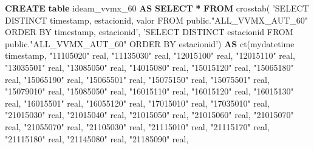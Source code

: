 \documentclass[12pt,oneside]{reedthesis}
\newenvironment{Shaded}{\begin{snugshade}}{\end{snugshade}}
\newcommand{\DataTypeTok}[1]{\textcolor[rgb]{0.13,0.29,0.53}{#1}}
\newcommand{\KeywordTok}[1]{\textcolor[rgb]{0.13,0.29,0.53}{\textbf{#1}}}
\newcommand{\NormalTok}[1]{#1}
\newcommand{\OperatorTok}[1]{\textcolor[rgb]{0.81,0.36,0.00}{\textbf{#1}}}
\newcommand{\OtherTok}[1]{\textcolor[rgb]{0.56,0.35,0.01}{#1}}
\newcommand{\StringTok}[1]{\textcolor[rgb]{0.31,0.60,0.02}{#1}}
\begin{document}
\vspace{0.4cm}
\begin{Shaded}
\begin{Highlighting}[]
    \KeywordTok{CREATE} \KeywordTok{table}\NormalTok{ ideam_vvmx_60 }\KeywordTok{AS}
    \KeywordTok{SELECT} \OperatorTok{*} \KeywordTok{FROM}\NormalTok{ crosstab(}
    \StringTok{'SELECT DISTINCT}
\StringTok{      timestamp,}
\StringTok{      estacionid,}
\StringTok{      valor}
\StringTok{    FROM }
\StringTok{      public."ALL_VVMX_AUT_60" }
\StringTok{    ORDER BY timestamp, estacionid'}\NormalTok{,}
    \StringTok{'SELECT DISTINCT}
\StringTok{      estacionid}
\StringTok{    FROM }
\StringTok{      public."ALL_VVMX_AUT_60" }
\StringTok{    ORDER BY estacionid'}\NormalTok{)}
    \KeywordTok{AS}\NormalTok{ ct(mydatetime }\DataTypeTok{timestamp}\NormalTok{, }\OtherTok{"11105020"} \DataTypeTok{real}\NormalTok{, }\OtherTok{"11135030"} \DataTypeTok{real}\NormalTok{, }\OtherTok{"12015100"} \DataTypeTok{real}\NormalTok{, }\OtherTok{"12015110"} \DataTypeTok{real}\NormalTok{,}
     \OtherTok{"13035501"} \DataTypeTok{real}\NormalTok{, }\OtherTok{"13085050"} \DataTypeTok{real}\NormalTok{, }\OtherTok{"14015080"} \DataTypeTok{real}\NormalTok{, }\OtherTok{"15015120"} \DataTypeTok{real}\NormalTok{, }\OtherTok{"15065180"} \DataTypeTok{real}\NormalTok{, }\OtherTok{"15065190"} \DataTypeTok{real}\NormalTok{, }
     \OtherTok{"15065501"} \DataTypeTok{real}\NormalTok{, }\OtherTok{"15075150"} \DataTypeTok{real}\NormalTok{, }\OtherTok{"15075501"} \DataTypeTok{real}\NormalTok{, }\OtherTok{"15079010"} \DataTypeTok{real}\NormalTok{, }\OtherTok{"15085050"} \DataTypeTok{real}\NormalTok{, }\OtherTok{"16015110"} \DataTypeTok{real}\NormalTok{, }
     \OtherTok{"16015120"} \DataTypeTok{real}\NormalTok{, }\OtherTok{"16015130"} \DataTypeTok{real}\NormalTok{, }\OtherTok{"16015501"} \DataTypeTok{real}\NormalTok{, }\OtherTok{"16055120"} \DataTypeTok{real}\NormalTok{, }\OtherTok{"17015010"} \DataTypeTok{real}\NormalTok{, }\OtherTok{"17035010"} \DataTypeTok{real}\NormalTok{, }
     \OtherTok{"21015030"} \DataTypeTok{real}\NormalTok{, }\OtherTok{"21015040"} \DataTypeTok{real}\NormalTok{, }\OtherTok{"21015050"} \DataTypeTok{real}\NormalTok{, }\OtherTok{"21015060"} \DataTypeTok{real}\NormalTok{, }\OtherTok{"21015070"} \DataTypeTok{real}\NormalTok{, }\OtherTok{"21055070"} \DataTypeTok{real}\NormalTok{, }
     \OtherTok{"21105030"} \DataTypeTok{real}\NormalTok{, }\OtherTok{"21115010"} \DataTypeTok{real}\NormalTok{, }\OtherTok{"21115170"} \DataTypeTok{real}\NormalTok{, }\OtherTok{"21115180"} \DataTypeTok{real}\NormalTok{, }\OtherTok{"21145080"} \DataTypeTok{real}\NormalTok{, }\OtherTok{"21185090"} \DataTypeTok{real}\NormalTok{, }

\end{Highlighting}
\end{Shaded}
\end{document}
